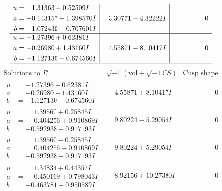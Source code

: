 \documentclass[1p]{elsarticle_modified}
\theoremstyle{definition}
\newcommand{\I}{\sqrt{-1}}
\begin{document}
$$\begin{array}{c|c|c}
\begin{aligned}
u &= \phantom{-}1.31363 - 0.52509 I \\
a &= -0.143157 + 1.398570 I \\
b &= -1.072430 - 0.707601 I\end{aligned}
 & \phantom{-}3.30771 - 4.32222 I & \phantom{-0.000000 } 0 \\ \hline\begin{aligned}
u &= -1.27396 + 0.62381 I \\
a &= -0.26980 + 1.43160 I \\
b &= -1.127130 - 0.674560 I\end{aligned}
 & \phantom{-}4.55871 - 8.10417 I & \phantom{-0.000000 } 0\\
 \hline 
 \end{array}$$\newpage$$\begin{array}{c|c|c}  
\text{Solutions to }I^u_{1}& \I (\text{vol} + \sqrt{-1}CS) & \text{Cusp shape}\\
 \hline 
\begin{aligned}
u &= -1.27396 - 0.62381 I \\
a &= -0.26980 - 1.43160 I \\
b &= -1.127130 + 0.674560 I\end{aligned}
 & \phantom{-}4.55871 + 8.10417 I & \phantom{-0.000000 } 0 \\ \hline\begin{aligned}
u &= \phantom{-}1.39560 + 0.25845 I \\
a &= \phantom{-}0.404256 + 0.910869 I \\
b &= -0.592938 - 0.917193 I\end{aligned}
 & \phantom{-}9.80224 - 5.29054 I & \phantom{-0.000000 } 0 \\ \hline\begin{aligned}
u &= \phantom{-}1.39560 - 0.25845 I \\
a &= \phantom{-}0.404256 - 0.910869 I \\
b &= -0.592938 + 0.917193 I\end{aligned}
 & \phantom{-}9.80224 + 5.29054 I & \phantom{-0.000000 } 0 \\ \hline\begin{aligned}
u &= \phantom{-}1.34834 + 0.44357 I \\
a &= \phantom{-}0.450169 + 0.798043 I \\
b &= -0.463781 - 0.950589 I\end{aligned}
 & \phantom{-}8.92156 + 10.27380 I & \phantom{-0.000000 } 0 \\ \hline\begin{aligned}

\end{aligned}
\end{array}$$
\end{document}
